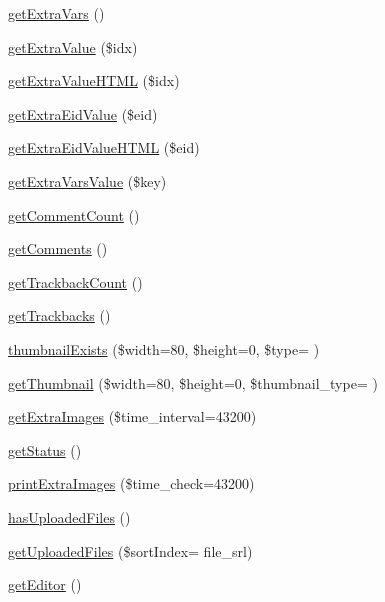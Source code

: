 \begin{DoxyCompactItemize}
\hyperlink{classdocumentItem_afe41c70dfb21cc8b8d397a3af24eb895}{get\+Extra\+Vars} ()
\item 
\hyperlink{classdocumentItem_a5b0cd52819bcb058a7e8a6764aef79d1}{get\+Extra\+Value} (\$idx)
\item 
\hyperlink{classdocumentItem_a0100c3b24a5c4b75b0edc1bfd139e77a}{get\+Extra\+Value\+H\+T\+ML} (\$idx)
\item 
\hyperlink{classdocumentItem_a9c2574375684cd06a16532744e279c65}{get\+Extra\+Eid\+Value} (\$eid)
\item 
\hyperlink{classdocumentItem_a52091af79c2df80f8f3c75e37adc2000}{get\+Extra\+Eid\+Value\+H\+T\+ML} (\$eid)
\item 
\hyperlink{classdocumentItem_ab555cb21a9a50d683836b8d4604d47f5}{get\+Extra\+Vars\+Value} (\$key)
\item 
\hyperlink{classdocumentItem_a9ed429fc56e6f95ef097645c772aa4e5}{get\+Comment\+Count} ()
\item 
\hyperlink{classdocumentItem_ad85b3da641f8bd477963d7290383e6be}{get\+Comments} ()
\item 
\hyperlink{classdocumentItem_af1520e91e8dd49202cfb93909db61c48}{get\+Trackback\+Count} ()
\item 
\hyperlink{classdocumentItem_a0c69601e59c290048081bf8d8aa7602e}{get\+Trackbacks} ()
\item 
\hyperlink{classdocumentItem_a3a8615b0ed43420047a75fb6cb719d86}{thumbnail\+Exists} (\$width=80, \$height=0, \$type= \textquotesingle{}\textquotesingle{})
\item 
\hyperlink{classdocumentItem_a033dd804282c738052af3347e9816ef4}{get\+Thumbnail} (\$width=80, \$height=0, \$thumbnail\+\_\+type= \textquotesingle{}\textquotesingle{})
\item 
\hyperlink{classdocumentItem_a0f72df4345359453aa01ff1490071c5a}{get\+Extra\+Images} (\$time\+\_\+interval=43200)
\item 
\hyperlink{classdocumentItem_aa750ee0716698bf29c9690382b7fa3ef}{get\+Status} ()
\item 
\hyperlink{classdocumentItem_a9d185a16e4439823e7e4871c2fb0659a}{print\+Extra\+Images} (\$time\+\_\+check=43200)
\item 
\hyperlink{classdocumentItem_af031d09271c9099d26b6619f9c436f68}{has\+Uploaded\+Files} ()
\item 
\hyperlink{classdocumentItem_a47ef433ba4e5147842df6c83f341d5d4}{get\+Uploaded\+Files} (\$sort\+Index= \textquotesingle{}file\+\_\+srl\textquotesingle{})
\item 
\hyperlink{classdocumentItem_a26477197e85301bc88e35157fdcb7482}{get\+Editor} ()

\end{DoxyCompactItemize}
